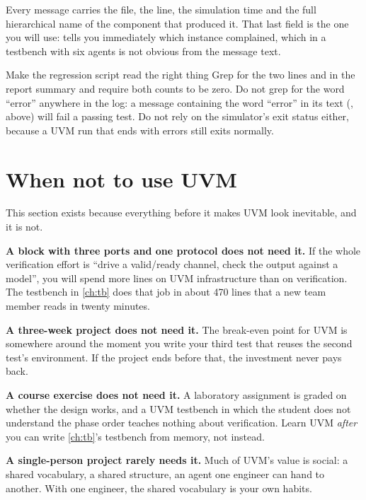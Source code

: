 Every message carries the file, the line, the simulation time and the full
hierarchical name of the component that produced it. That last field is the
one you will use:  tells you immediately which
instance complained, which in a testbench with six agents is not obvious from
the message text.

\begin{tipbox}{Make the regression script read the right thing}
Grep for the two lines  and  in the
report summary and require both counts to be zero. Do not grep for the word
``error'' anywhere in the log: a message containing the word ``error'' in its
text (, above) will fail a passing test. Do not
rely on the simulator's exit status either, because a UVM run that ends with
errors still exits normally.
\end{tipbox}

\section{When not to use UVM}
\label{sec:uvm:when-not}

%
This section exists because everything before it makes UVM look inevitable,
and it is not.

\textbf{A block with three ports and one protocol does not need it.} If the
whole verification effort is ``drive a valid/ready channel, check the output
against a model'', you will spend more lines on UVM infrastructure than on
verification. The testbench in \cref{ch:tb} does that job in about 470 lines that a
new team member reads in twenty minutes.

\textbf{A three-week project does not need it.} The break-even point for UVM
is somewhere around the moment you write your third test that reuses the
second test's environment. If the project ends before that, the investment
never pays back.

\textbf{A course exercise does not need it.} A laboratory assignment is
graded on whether the design works, and a UVM testbench in which the student
does not understand the phase order teaches nothing about verification. Learn
UVM \emph{after} you can write \cref{ch:tb}'s testbench from memory, not
instead.

\textbf{A single-person project rarely needs it.} Much of UVM's value is
social: a shared vocabulary, a shared structure, an agent one engineer can
hand to another. With one engineer, the shared vocabulary is your own habits.

